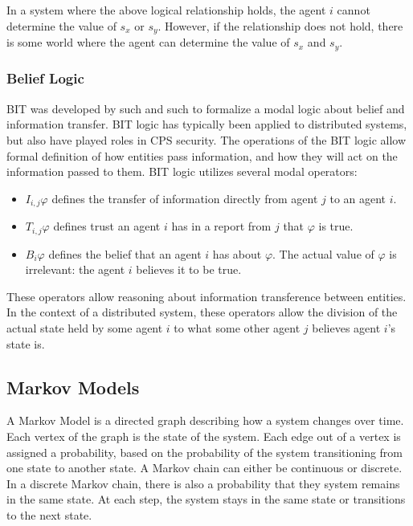 In a system where the above logical relationship holds, the agent $i$ cannot determine the value of $s_x$ or $s_y$. However, if the relationship does not hold, there is some world where the agent can determine the value of $s_x$ and $s_y$.

\subsubsection{Belief Logic}

\ac{BIT} was developed by such and such to formalize a modal logic about belief and information transfer. \ac{BIT} logic has typically been applied to distributed systems, but also have played roles in \ac{CPS} security. The operations of the \ac{BIT} logic allow formal definition of how entities pass information, and how they will act on the information passed to them. \ac{BIT} logic utilizes several modal operators:

\begin{itemize}
\item $I_{i,j} \varphi$ defines the transfer of information directly from agent $j$ to an agent $i$. 
\item $T_{i,j} \varphi$ defines trust an agent $i$ has in a report from $j$ that $\varphi$ is true.
\item $B_i \varphi$ defines the belief that an agent $i$ has about $\varphi$. The actual value of $\varphi$ is irrelevant: the agent $i$ believes it to be true.
\end{itemize}

These operators allow reasoning about information transference between entities. In the context of a distributed system, these operators allow the division of the actual state held by some agent $i$ to what some other agent $j$ believes agent $i$'s state is.

\subsection{Markov Models}

A Markov Model is a directed graph describing how a system changes over time. Each vertex of the graph is the state of the system. Each edge out of a vertex is assigned a probability, based on the probability of the system transitioning from one state to another state. A Markov chain can either be continuous or discrete. In a discrete Markov chain, there is also a probability that they system remains in the same state. At each step, the system stays in the same state or transitions to the next state.

